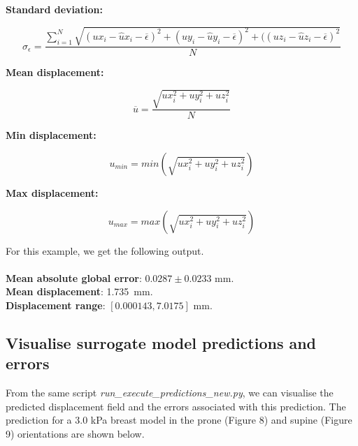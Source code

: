 \documentclass[11pt]{article}
\begin{document}
\textbf{Standard deviation: }
\begin{itemize}
    \begin{equation}
         \sigma_{\epsilon} = \frac{\sum_{i=1}^{N}\sqrt{(ux_{i} - \hat{u}x_{i} - \overline{\epsilon})^2 + (uy_{i} - \hat{u}y_{i} - \overline{\epsilon})^2 + ((uz_{i} -\hat{u}z_{i} - \overline{\epsilon})^2}}{N}
    \end{equation}
\end{itemize}

\textbf{Mean displacement: }
\begin{itemize}
    \begin{equation}
        \overline{u} = \frac{\sqrt{ux_{i}^2 + uy_{i}^2 + uz_{i}^2}}{N}
    \end{equation}
\end{itemize}

\textbf{Min displacement: }
\begin{itemize}
    \begin{equation}
        u_{min} = min(\sqrt{ux_{i}^2 + uy_{i}^2 + uz_{i}^2})    
    \end{equation}
\end{itemize}

\textbf{Max displacement: }
\begin{itemize}
    \begin{equation}
        u_{max} = max(\sqrt{ux_{i}^2 + uy_{i}^2 + uz_{i}^2})    
    \end{equation}
\end{itemize}

For this example, we get the following output. \\
\\
\textbf{Mean absolute global error}: $0.0287 \pm 0.0233$ mm. \\
\textbf{Mean displacement}: \SI{1.735}{mm}. \\
\textbf{Displacement range}: $[0.000143, 7.0175]$ mm. 

\subsection{Visualise surrogate model predictions and errors}
From the same script \textit{run\_execute\_predictions\_new.py}, we can visualise the predicted displacement field and the errors associated with this prediction. The prediction for a 3.0 kPa breast model in the prone (Figure 8) and supine (Figure 9) orientations are shown below. 
\end{document}
